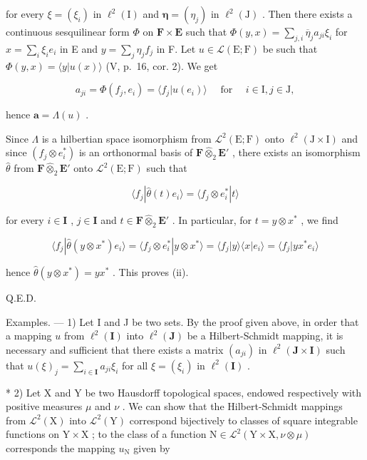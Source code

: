 for every \(\xi = (\xi_i)\) in \(\ell^2 (\mathrm{I})\) and \(\pmb{\eta} = (\eta_j)\) in \(\ell^2 (\mathrm{J})\) . Then there exists a continuous sesquilinear form \(\Phi\) on \(\mathbf{F}\times \mathbf{E}\) such that \(\Phi (y,x) = \sum_{j,i}\overline{\eta}_ja_{ji}\xi_i\) for \(x = \sum_{i}\xi_{i}e_{i}\) in E and \(y = \sum_{j}\eta_{j}f_{j}\) in F. Let \(u\in \mathcal{L}(\mathrm{E};\mathrm{F})\) be such that \(\Phi (y,x) = \langle y|u(x)\rangle\) (V, p.~16, cor. 2). We get

\[
a _ {j i} = \Phi (f _ {j}, e _ {i}) = \langle f _ {j} | u (e _ {i}) \rangle \quad \text { for } \quad i \in \mathrm{I}, j \in \mathrm{J}  ,
\]

hence \(\mathbf{a} = \Lambda(u)\) .

Since \(\Lambda\) is a hilbertian space isomorphism from \(\mathcal{L}^2 (\mathrm{E};\mathrm{F})\) onto \(\ell^2 (\mathrm{J}\times \mathrm{I})\) and since \((f_j\otimes e_i^*)\) is an orthonormal basis of \(\mathbf{F}\hat{\otimes}_2\mathbf{E}'\) , there exists an isomorphism \(\hat{\theta}\) from \(\mathbf{F}\hat{\otimes}_2\mathbf{E}'\) onto \(\mathcal{L}^2 (\mathrm{E};\mathrm{F})\) such that

\[
\langle f _ {j} | \hat {\theta} (t) e _ {i} \rangle = \langle f _ {j} \otimes e _ {i} ^ {*} | t \rangle
\]

for every \(i \in \mathbf{I}\) , \(j \in \mathbf{I}\) and \(t \in \mathbf{F} \hat{\otimes}_2 \mathbf{E}'\) . In particular, for \(t = y \otimes x^*\) , we find

\[
\langle f _ {j} | \hat {\theta} (y \otimes x ^ {*}) e _ {i} \rangle = \langle f _ {j} \otimes e _ {i} ^ {*} | y \otimes x ^ {*} \rangle = \langle f _ {j} | y \rangle \langle x | e _ {i} \rangle = \langle f _ {j} | y x ^ {*} e _ {i} \rangle
\]

hence \(\hat{\theta}(y\otimes x^{*}) = yx^{*}\) . This proves (ii).

Q.E.D.

Examples. --- 1) Let I and J be two sets. By the proof given above, in order that a mapping \(u\) from \(\ell^2(\mathbf{I})\) into \(\ell^2(\mathbf{J})\) be a Hilbert-Schmidt mapping, it is necessary and sufficient that there exists a matrix \((a_{ji})\) in \(\ell^2(\mathbf{J} \times \mathbf{I})\) such that \(u(\xi)_j = \sum_{i \in \mathbf{I}} a_{ji} \xi_i\) for all \(\xi = (\xi_i)\) in \(\ell^2(\mathbf{I})\) .

* 2) Let X and Y be two Hausdorff topological spaces, endowed respectively with positive measures \(\mu\) and \(\nu\) . We can show that the Hilbert-Schmidt mappings from \(\mathcal{L}^2(\mathrm{X})\) into \(\mathcal{L}^2(\mathrm{Y})\) correspond bijectively to classes of square integrable functions on \(\mathrm{Y} \times \mathrm{X}\) ; to the class of a function \(\mathrm{N} \in \mathcal{L}^2(\mathrm{Y} \times \mathrm{X}, \nu \otimes \mu)\) corresponds the mapping \(u_{\mathrm{N}}\) given by

